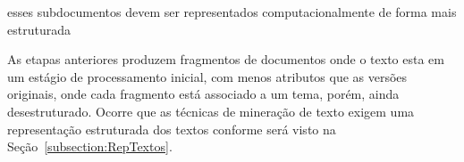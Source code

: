 

esses subdocumentos devem ser representados computacionalmente de forma mais estruturada


As etapas anteriores produzem fragmentos de documentos onde o texto esta em um estágio de processamento inicial, com menos atributos que as versões originais, onde cada fragmento está associado a um tema, porém, ainda desestruturado. Ocorre que as técnicas de mineração de texto exigem uma representação estruturada dos textos conforme será visto na Seção~\ref{subsection:RepTextos}.












